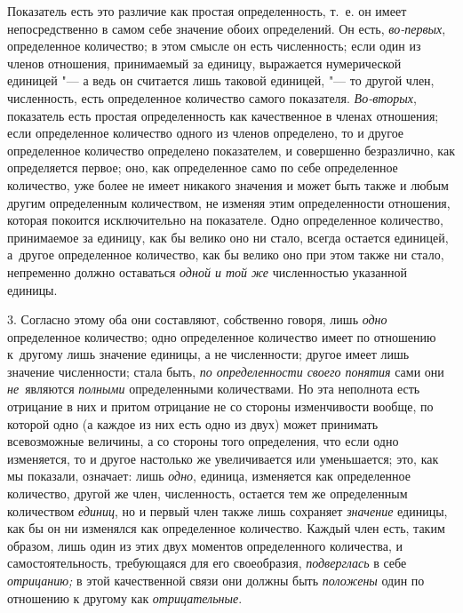 Показатель есть это различие как простая определенность, т.~е. он имеет
непосредственно в самом себе значение обоих определений. Он есть, {\em
во-первых}, определенное количество; в этом смысле он есть численность; если
один из членов отношения, принимаемый за единицу, выражается нумерической
единицей "--- а ведь он считается лишь таковой единицей, "--- то другой член,
численность, есть определенное количество самого показателя. {\em Во-вторых},
показатель есть простая определенность как качественное в членах отношения;
если определенное количество одного из членов определено, то и другое
определенное количество определено показателем, и совершенно безразлично, как
определяется первое; оно, как определенное само по себе определенное
количество, уже более не имеет никакого значения и может быть также и любым
другим определенным количеством, не изменяя этим определенности отношения,
которая покоится исключительно на показателе. Одно определенное количество,
принимаемое за единицу, как бы велико оно ни стало, всегда остается единицей,
а~другое определенное количество, как бы велико оно при этом также ни стало,
непременно должно оставаться {\em одной и той же} численностью указанной
единицы.

3. Согласно этому оба они составляют, собственно говоря, лишь {\em одно}
определенное количество; одно определенное количество имеет по отношению
к~другому лишь значение единицы, а не численности; другое имеет лишь значение
численности; стала быть, {\em по определенности своего понятия} сами они
{\em не}~являются {\em полными} определенными количествами. Но эта неполнота
есть отрицание в них и притом отрицание не со стороны изменчивости вообще, по
которой одно (а каждое из них есть одно из двух) может принимать всевозможные
величины, а со стороны того определения, что если одно изменяется, то и другое
настолько же увеличивается или уменьшается; это, как мы показали, означает:
лишь {\em одно}, единица, изменяется как определенное количество, другой же
член, численность, остается тем же определенным количеством {\em единиц}, но и
первый член также лишь сохраняет {\em значение} единицы, как бы он ни изменялся
как определенное количество. Каждый член есть, таким образом, лишь один из этих
двух моментов определенного количества, и самостоятельность, требующаяся для
его своеобразия, {\em подверглась} в себе {\em отрицанию;} в этой качественной
связи они должны быть {\em положены} один по отношению к другому как
{\em отрицательные}.

